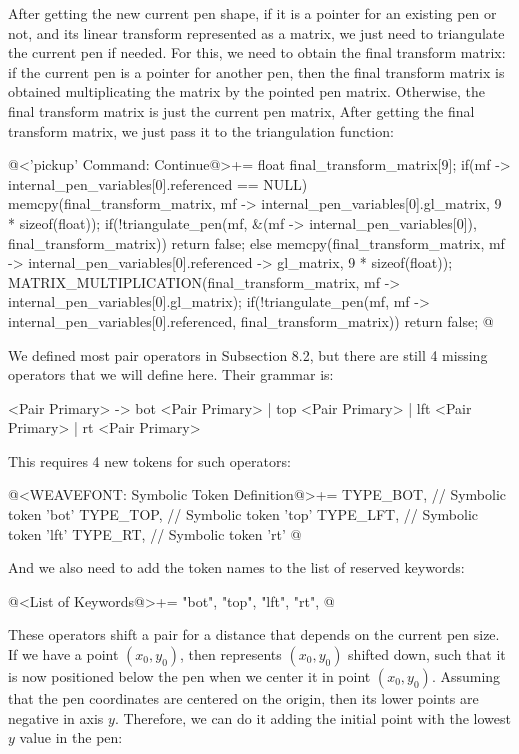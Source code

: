 {{{{{After getting the new current pen shape, if it is a pointer for an
existing pen or not, and its linear transform represented as a matrix,
we just need to triangulate the current pen if needed. For this, we
need to obtain the final transform matrix: if the current pen is a
pointer for another pen, then the final transform matrix is obtained
multiplicating the  matrix by the pointed pen
matrix. Otherwise, the final transform matrix is just the current pen
matrix, After getting the final transform matrix, we just pass it to
the triangulation function:

\iniciocodigo
@<'pickup' Command: Continue@>+=
{
  float final_transform_matrix[9];
  if(mf -> internal_pen_variables[0].referenced == NULL){
    memcpy(final_transform_matrix, mf -> internal_pen_variables[0].gl_matrix,
           9 * sizeof(float));
    if(!triangulate_pen(mf, &(mf -> internal_pen_variables[0]),
                        final_transform_matrix))
      return false;
  }
  else{
    memcpy(final_transform_matrix,
           mf -> internal_pen_variables[0].referenced -> gl_matrix,
           9 * sizeof(float));
    MATRIX_MULTIPLICATION(final_transform_matrix,
                          mf -> internal_pen_variables[0].gl_matrix);
    if(!triangulate_pen(mf, mf -> internal_pen_variables[0].referenced,
                        final_transform_matrix))
      return false;
  }
}
@
\fimcodigo


We defined most pair operators in Subsection 8.2, but there are still
4 missing operators that we will define here. Their grammar is:

\alinhaverbatim
<Pair Primary> -> bot <Pair Primary> | top <Pair Primary> |
                  lft <Pair Primary> | rt <Pair Primary>
\alinhanormal

This requires 4 new tokens for such operators:

\iniciocodigo
@<WEAVEFONT: Symbolic Token Definition@>+=
TYPE_BOT,  // Symbolic token 'bot'
TYPE_TOP,  // Symbolic token 'top'
TYPE_LFT,  // Symbolic token 'lft'
TYPE_RT,   // Symbolic token 'rt'
@
\fimcodigo

And we also need to add the token names to the list of reserved
keywords:

\iniciocodigo
@<List of Keywords@>+=
"bot", "top", "lft", "rt",
@
\fimcodigo

These operators shift a pair for a distance that depends on the
current pen size. If we have a point $(x_0, y_0)$,
then  represents $(x_0, y_0)$ shifted down,
such that it is now positioned below the pen when we center it in
point $(x_0, y_0)$. Assuming that the pen coordinates are centered on
the origin, then its lower points are negative in axis $y$. Therefore,
we can do it adding the initial point with the lowest $y$ value in the
pen:

}}}}}
